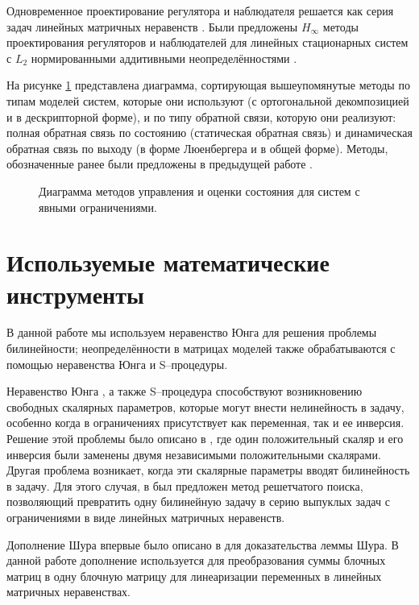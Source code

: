 Одновременное проектирование регулятора и наблюдателя решается как серия задач линейных матричных неравенств \cite{ZEMOUCHE2015,GRITLI2021}. Были предложены $H_\infty$ методы проектирования регуляторов и наблюдателей для линейных стационарных систем с $L_2$ нормированными аддитивными неопределённостями \cite{Bennani2019, KHELOUFI2016}.

На рисунке \ref{fig:table} представлена диаграмма, сортирующая вышеупомянутые методы по типам моделей систем, которые они используют (с ортогональной декомпозицией и в дескрипторной форме), и по типу обратной связи, которую они реализуют: полная обратная связь по состоянию (статическая обратная связь) и динамическая обратная связь по выходу (в форме Люенбергера и в общей форме). Методы, обозначенные ранее были предложены в предыдущей работе \cite{Mastersthesis}.

\begin{figure}[ht]
	\caption{Диаграмма методов управления и оценки состояния для систем с явными ограничениями.}\label{fig:table}
\end{figure}

\section{Используемые математические инструменты}\label{sec:ch1/sec7}
В данной работе мы используем неравенство Юнга для решения проблемы билинейности; неопределённости в матрицах моделей также обрабатываются с помощью неравенства Юнга и S--процедуры.

Неравенство Юнга \cite{BOYED1994}, а также S--процедура \cite{Amato2011,LIEN2008} способствуют возникновению свободных скалярных параметров, которые могут внести нелинейность в задачу, особенно когда в ограничениях присутствует как переменная, так и ее инверсия. Решение этой проблемы было описано в \cite{KHELOUFI2016}, где один положительный скаляр и его инверсия были заменены двумя независимыми положительными скалярами. Другая проблема возникает, когда эти скалярные параметры вводят билинейность в задачу. Для этого случая, в \cite{KHELOUFI2013} был предложен метод решетчатого поиска, позволяющий превратить одну билинейную задачу в серию выпуклых задач с ограничениями в виде линейных матричных неравенств.

Дополнение Шура впервые было описано в \cite{Schur} для доказательства леммы Шура. В данной работе дополнение используется для преобразования суммы блочных матриц в одну блочную матрицу для линеаризации переменных в линейных матричных неравенствах.
\FloatBarrier
